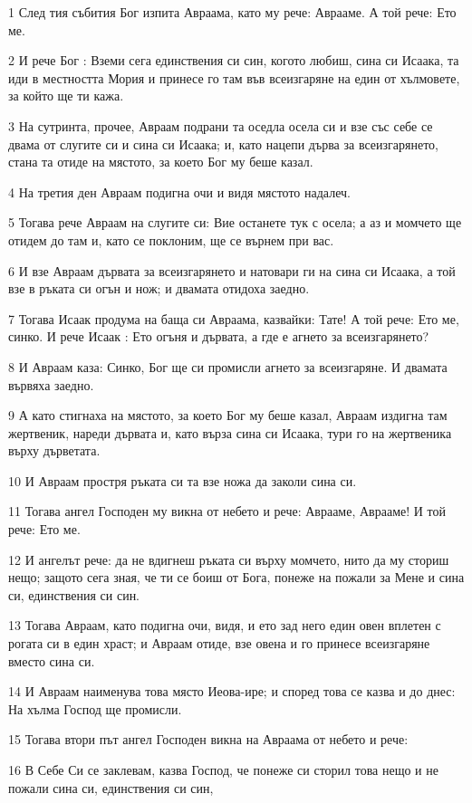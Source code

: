 \par 1 След тия събития Бог изпита Авраама, като му рече: Аврааме. А той рече: Ето ме.
\par 2 И рече Бог : Вземи сега единствения си син, когото любиш, сина си Исаака, та иди в местността Мория и принесе го там във всеизгаряне на един от хълмовете, за който ще ти кажа.
\par 3 На сутринта, прочее, Авраам подрани та оседла осела си и взе със себе се двама от слугите си и сина си Исаака; и, като нацепи дърва за всеизгарянето, стана та отиде на мястото, за което Бог му беше казал.
\par 4 На третия ден Авраам подигна очи и видя мястото надалеч.
\par 5 Тогава рече Авраам на слугите си: Вие останете тук с осела; а аз и момчето ще отидем до там и, като се поклоним, ще се върнем при вас.
\par 6 И взе Авраам дървата за всеизгарянето и натовари ги на сина си Исаака, а той взе в ръката си огън и нож; и двамата отидоха заедно.
\par 7 Тогава Исаак продума на баща си Авраама, казвайки: Тате! А той рече: Ето ме, синко. И рече Исаак : Ето огъня и дървата, а где е агнето за всеизгарянето?
\par 8 И Авраам каза: Синко, Бог ще си промисли агнето за всеизгаряне. И двамата вървяха заедно.
\par 9 А като стигнаха на мястото, за което Бог му беше казал, Авраам издигна там жертвеник, нареди дървата и, като върза сина си Исаака, тури го на жертвеника върху дърветата.
\par 10 И Авраам простря ръката си та взе ножа да заколи сина си.
\par 11 Тогава ангел Господен му викна от небето и рече: Аврааме, Аврааме! И той рече: Ето ме.
\par 12 И ангелът рече: да не вдигнеш ръката си върху момчето, нито да му сториш нещо; защото сега зная, че ти се боиш от Бога, понеже на пожали за Мене и сина си, единствения си син.
\par 13 Тогава Авраам, като подигна очи, видя, и ето зад него един овен вплетен с рогата си в един храст; и Авраам отиде, взе овена и го принесе всеизгаряне вместо сина си.
\par 14 И Авраам наименува това място Иеова-ире; и според това се казва и до днес: На хълма Господ ще промисли.
\par 15 Тогава втори път ангел Господен викна на Авраама от небето и рече:
\par 16 В Себе Си се заклевам, казва Господ, че понеже си сторил това нещо и не пожали сина си, единствения си син,
